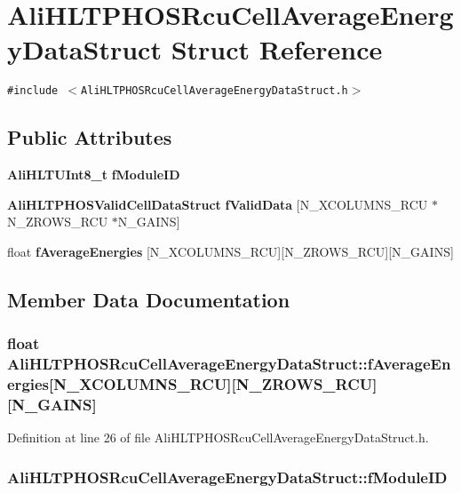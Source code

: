 \section{Ali\-HLTPHOSRcu\-Cell\-Average\-Energy\-Data\-Struct Struct Reference}
\label{structAliHLTPHOSRcuCellAverageEnergyDataStruct}
{\tt \#include $<$Ali\-HLTPHOSRcu\-Cell\-Average\-Energy\-Data\-Struct.h$>$}

\subsection*{Public Attributes}
\begin{CompactItemize}
\item 
{\bf Ali\-HLTUInt8\_\-t} {\bf f\-Module\-ID}
\item 
{\bf Ali\-HLTPHOSValid\-Cell\-Data\-Struct} {\bf f\-Valid\-Data} [N\_\-XCOLUMNS\_\-RCU $\ast$N\_\-ZROWS\_\-RCU $\ast$N\_\-GAINS]
\item 
float {\bf f\-Average\-Energies} [N\_\-XCOLUMNS\_\-RCU][N\_\-ZROWS\_\-RCU][N\_\-GAINS]
\end{CompactItemize}


\subsection{Member Data Documentation}
\subsubsection{\setlength{\rightskip}{0pt plus 5cm}float {\bf Ali\-HLTPHOSRcu\-Cell\-Average\-Energy\-Data\-Struct::f\-Average\-Energies}[N\_\-XCOLUMNS\_\-RCU][N\_\-ZROWS\_\-RCU][N\_\-GAINS]}\label{structAliHLTPHOSRcuCellAverageEnergyDataStruct_o2}




Definition at line 26 of file Ali\-HLTPHOSRcu\-Cell\-Average\-Energy\-Data\-Struct.h.
\subsubsection{ {\bf Ali\-HLTPHOSRcu\-Cell\-Average\-Energy\-Data\-Struct::f\-Module\-ID}}\label{structAliHLTPHOSRcuCellAverageEnergyDataStruct_o0}




